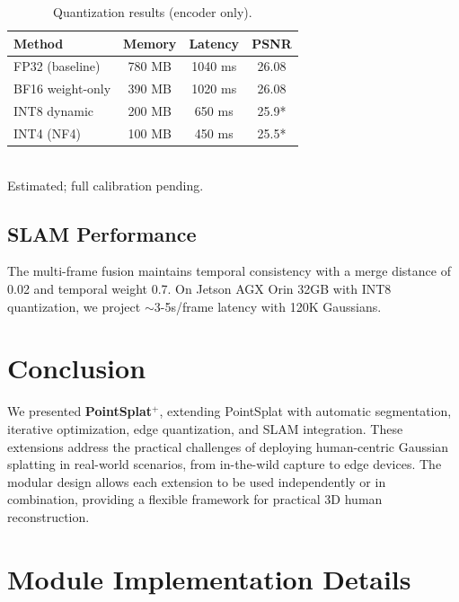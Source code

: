 \documentclass[10pt,twocolumn,letterpaper]{article}
\newcommand{\ours}{\textbf{PointSplat$^+$}}
\begin{document}
\begin{table}[t]
\centering
\small
\caption{Quantization results (encoder only).}
\label{tab:quant}
\begin{tabular}{lccc}
\toprule
Method & Memory & Latency & PSNR \\
\midrule
FP32 (baseline) & 780 MB & 1040 ms & 26.08 \\
BF16 weight-only & 390 MB & 1020 ms & 26.08 \\
INT8 dynamic & 200 MB & 650 ms & 25.9* \\
INT4 (NF4) & 100 MB & 450 ms & 25.5* \\
\bottomrule
\end{tabular}
\\
\small *Estimated; full calibration pending.
\end{table}

\subsection{SLAM Performance}

The multi-frame fusion maintains temporal consistency with a merge
distance of 0.02 and temporal weight 0.7. On Jetson AGX Orin 32GB with
INT8 quantization, we project $\sim$3-5s/frame latency with 120K Gaussians.

\section{Conclusion}
\label{sec:conclusion}

We presented \ours{}, extending PointSplat with automatic segmentation,
iterative optimization, edge quantization, and SLAM integration. These
extensions address the practical challenges of deploying human-centric
Gaussian splatting in real-world scenarios, from in-the-wild capture
to edge devices. The modular design allows each extension to be used
independently or in combination, providing a flexible framework for
practical 3D human reconstruction.

{\small


}

\appendix
\section{Module Implementation Details}
\label{sec:appendix}
\end{document}
